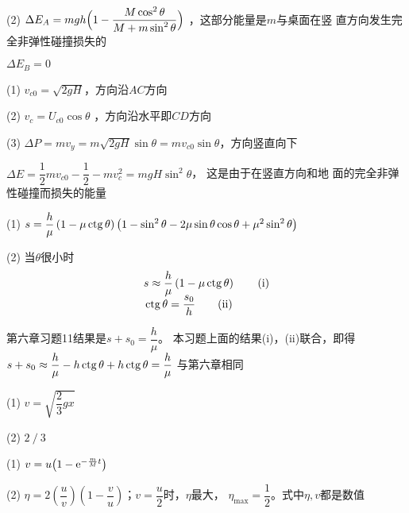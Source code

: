(2) $\Delta E_{A}=m g h\Bigl(1-\dfrac{M \cos ^{2} \theta}{M+m \sin ^{2} \theta} \Bigr)$
，这部分能量是$ m $与桌面在竖
直方向发生完全非弹性碰撞损失的

\aindent $ \Delta E _ { B } = 0   $

\answer (1) $ v _ { c0 } = \sqrt { 2 g H }   $，方向沿$ AC $方向

(2) $ v _ { c } = U _ { c0 } \cos \theta  $ ，方向沿水平即$ CD $方向

(3) $ \Delta P = m v _ { y } = m \sqrt { 2 g H } \sin \theta = m v _ { c0 } \sin \theta $，方向竖直向下

$ \Delta E = \dfrac { 1 } { 2 } m v _ { c0 } - \dfrac { 1 } { 2 } - m v _ { c } ^ { 2 } = m g H \sin ^ { 2 } \theta  $，  这是由于在竖直方向和地
面的完全非弹性碰撞而损失的能量

\answer (1) $ s = \dfrac { h } { \mu } \left( 1 - \mu \operatorname{ctg} \theta \right) \left( 1 - \sin ^ 2 \theta - 2 \mu \sin \theta \cos \theta + \mu ^ { 2 } \sin ^ { 2 } \theta \right) $

(2) 当$ \theta  $很小时%
\begin{align}
    &s \approx \frac { h } { \mu } \left( 1 - \mu \operatorname{ctg} \theta \right)  \tag{i} \\[-0.5em]
    &\operatorname{ctg} \theta = \frac { s _ { 0 } } { h }  \tag{ii}
\end{align}

第六章习题11结果是$ s + s _ { 0 } = \dfrac { h } { \mu }  $。
本习题上面的结果(i)，(ii)联合，即得
$ s + s _ { 0 } \approx \dfrac { h } { \mu } - h \operatorname{ctg} \theta + h \operatorname{ctg} \theta = \dfrac { h } { \mu }   $
与第六章相同

\answer  (1) $ v = \sqrt { \dfrac{ 2 } { 3 } g x }   $

(2) $ 2 \operatorname{/} 3  $

\answer (1) $ v = u \bigl( 1 - \mathrm e ^ { - \frac { m } { M } t } \bigr)  $

(2) $ \eta = 2 \left( \dfrac { u } { v } \right) \left( 1 - \dfrac { v } { u } \right)  $；$  v = \dfrac { u } { 2 }   $时，$\eta$最大， $ \eta _ { \text{max}} = \dfrac { 1 } { 2 }   $。式中$ \eta, v $都是数值
